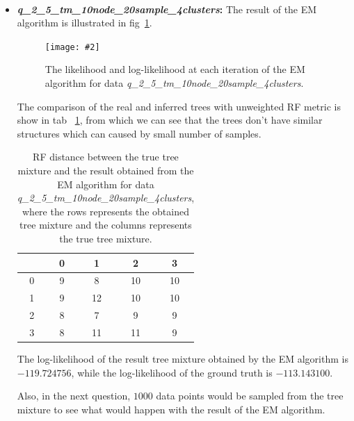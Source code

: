 \documentclass[11pt]{extarticle}
\newcommand{\0}{\mathbf{0}}
\renewcommand{\(}{\left(}
\renewcommand{\)}{\right)}
\theoremstyle{definition}
\newcommand{\image}[3]{
	\begin{figure}[!ht]
		\centering
	    \texttt{[image: \#2]}
		\caption{#3}
		\label{fig:#2}
	\end{figure}
}
\begin{document}
\noindent{} \\
\begin{itemize}
	\item \textbf{\textit{q\_2\_5\_tm\_10node\_20sample\_4clusters}:} The result of the EM algorithm is illustrated in fig~\ref{fig:D10_N20_K4}.
	\image{0.9}{D10_N20_K4}{The likelihood and log-likelihood at each iteration of the EM algorithm for data \textit{q\_2\_5\_tm\_10node\_20sample\_4clusters}.}
	\par The comparison of the real and inferred trees with unweighted RF metric is show in tab~ \ref{tab:RF_D10_N20_K4}, from which we can see that the trees don't have similar structures which can caused by small number of samples.
	\begin{table}[!ht]
		\centering
		\caption{RF distance between the true tree mixture and the result obtained from the EM algorithm for data \textit{q\_2\_5\_tm\_10node\_20sample\_4clusters}, where the rows represents the obtained tree mixture and the columns represents the true tree mixture.}
		\begin{tabular}{c|cccc}
			 & 0 & 1 & 2 & 3 \\
			 \hline
			 0 & 9 & 8 & 10 & 10 \\
			 1 & 9 & 12 & 10 & 10 \\
			 2 & 8 & 7 & 9 & 9 \\
			 3 & 8 & 11 & 11 & 9
		\end{tabular}
		\label{tab:RF_D10_N20_K4}
	\end{table}
	\par The log-likelihood of the result tree mixture obtained by the EM algorithm is $-119.724756$, while the log-likelihood of the ground truth is $-113.143100$.
	\par Also, in the next question, $1000$ data points would be sampled from the tree mixture to see what would happen with the result of the EM algorithm.


\end{itemize}
\end{document}
